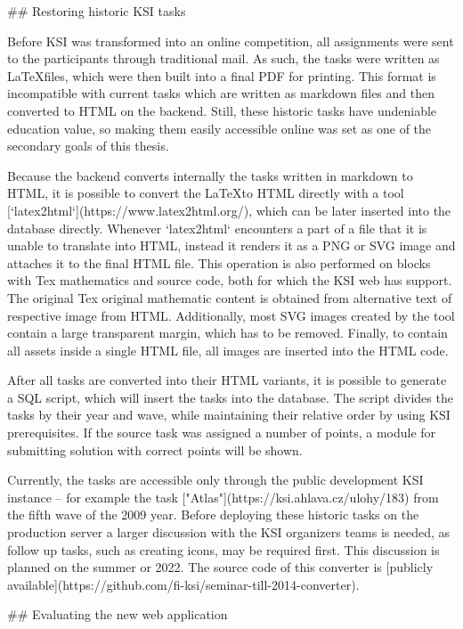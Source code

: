 \documentclass[
  digital, %
  oneside, %
  lof,     %
  lot,     %
]{fithesis4}
\begin{document}
{## Restoring historic KSI tasks

Before KSI was transformed into an online competition, all assignments were sent to the participants through traditional mail. As such, the tasks were written as \LaTeX files, which were then built into a final PDF for printing. This format is incompatible with current tasks which are written as markdown files and then converted to HTML on the backend. Still, these historic tasks have undeniable education value, so making them easily accessible online	was set as one of the secondary goals of this thesis.

Because the backend converts internally the tasks written in markdown to HTML, it is possible to convert the \LaTeX to HTML directly with a tool [`latex2html`](https://www.latex2html.org/), which can be later inserted into the database directly. Whenever `latex2html` encounters a part of a file that it is unable to translate into HTML, instead it renders it as a PNG or SVG image and attaches it to the final HTML file. This operation is also performed on blocks with Tex mathematics and source code, both for which the KSI web has support. The original Tex original mathematic content is obtained from alternative text of respective image from HTML. Additionally, most SVG images created by the tool contain a large transparent margin, which has to be removed. Finally, to contain all assets inside a single HTML file, all images are inserted into the HTML code.

After all tasks are converted into their HTML variants, it is possible to generate a SQL script, which will insert the tasks into the database. The script divides the tasks by their year and wave, while maintaining their relative order by using KSI prerequisites. If the source task was assigned a number of points, a module for submitting solution with correct points will be shown.

Currently, the tasks are accessible only through the public development KSI instance -- for example the task ["Atlas"](https://ksi.ahlava.cz/ulohy/183) from the fifth wave of the 2009 year. Before deploying these historic tasks on the production server a larger discussion with the KSI organizers teams is needed, as follow up tasks, such as creating icons, may be required first. This discussion is planned on the summer or 2022. The source code of this converter is [publicly available](https://github.com/fi-ksi/seminar-till-2014-converter).

## Evaluating the new web application

}
\end{document}
